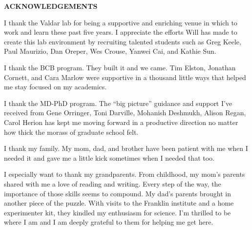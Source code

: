 
\begin{center}
\vspace*{52pt}
{\Large \textbf{ACKNOWLEDGEMENTS}}
\end{center}

I thank the Valdar lab for being a supportive and enriching venue in which to work and learn these past five years.
I appreciate the efforts Will has made to create this lab environment by recruiting talented students such as Greg Keele, Paul Maurizio, Dan Oreper, Wes Crouse, Yanwei Cai, and Kathie Sun.


I thank the BCB program.
They built it and we came.
Tim Elston, Jonathan Cornett, and Cara Marlow were supportive in a thousand little ways that helped me stay focused on my academics.

I thank the MD-PhD program.
The ``big picture'' guidance and support I've received from Gene Orringer, Toni Darville, Mohanish Deshmukh, Alison Regan, Carol Herion has kept me moving forward in a productive direction no matter how thick the morass of graduate school felt.

I thank my family.
My mom, dad, and brother have been patient with me when I needed it and gave me a little kick sometimes when I needed that too.

I especially want to thank my grandparents.
From childhood, my mom's parents shared with me a love of reading and writing.
Every step of the way, the importance of those skills seems to compound.
My dad's parents brought in another piece of the puzzle.
With visits to the Franklin institute and a home experimenter kit, they kindled my enthusiasm for science.
I'm thrilled to be where I am and I am deeply grateful to them for helping me get here.

\clearpage

